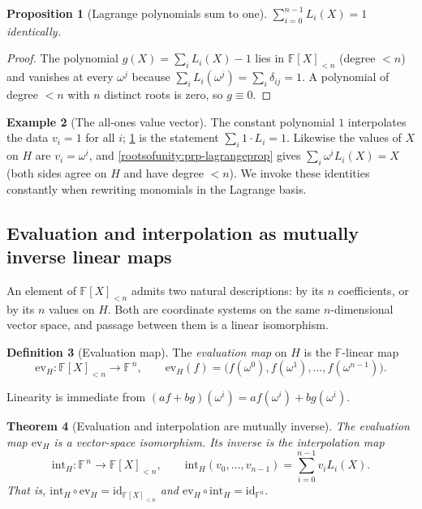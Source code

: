 \documentclass[11pt,a4paper]{article}
\newtheorem{theorem}{Theorem}[section]
\newtheorem{proposition}[theorem]{Proposition}
\theoremstyle{definition}
\newtheorem{definition}[theorem]{Definition}
\newtheorem{example}[theorem]{Example}
\theoremstyle{remark}
\newcommand{\F}{\ensuremath{\mathbb{F}}}
\begin{document}
\begin{proposition}[Lagrange polynomials sum to one]\label{rootsofunity:prp-partition}
\(\sum_{i=0}^{n-1} L_i(X) = 1\) identically.
\end{proposition}

\begin{proof}
The polynomial \(g(X) = \sum_i L_i(X) - 1\) lies in \(\F[X]_{<n}\) (degree \(< n\)) and vanishes at every \(\omega^j\) because \(\sum_i L_i(\omega^j) = \sum_i \delta_{ij} = 1\). A polynomial of degree \(< n\) with \(n\) distinct roots is zero, so \(g \equiv 0\).
\end{proof}

\begin{example}[The all-ones value vector]\label{rootsofunity:exp-constants}
The constant polynomial \(1\) interpolates the data \(v_i = 1\) for all \(i\); \cref{rootsofunity:prp-partition} is the statement \(\sum_i 1\cdot L_i = 1\). Likewise the values of \(X\) on \(H\) are \(v_i = \omega^i\), and \cref{rootsofunity:prp-lagrangeprop} gives \(\sum_i \omega^i L_i(X) = X\) (both sides agree on \(H\) and have degree \(< n\)). We invoke these identities constantly when rewriting monomials in the Lagrange basis.
\end{example}

\subsection{Evaluation and interpolation as mutually inverse linear maps}

An element of \(\F[X]_{<n}\) admits two natural descriptions: by its \(n\) coefficients, or by its \(n\) values on \(H\). Both are coordinate systems on the same \(n\)-dimensional vector space, and passage between them is a linear isomorphism.

\begin{definition}[Evaluation map]\label{rootsofunity:def-evalmap}
The \emph{evaluation map} on \(H\) is the \(\F\)-linear map
\[
  \mathrm{ev}_H \colon \F[X]_{<n} \longrightarrow \F^{\,n}, \qquad
  \mathrm{ev}_H(f) = \bigl(f(\omega^0), f(\omega^1), \dots, f(\omega^{n-1})\bigr).
\]
\end{definition}

Linearity is immediate from \((af+bg)(\omega^i) = a f(\omega^i) + b g(\omega^i)\).

\begin{theorem}[Evaluation and interpolation are mutually inverse]\label{rootsofunity:thm-evaliso}
The evaluation map \(\mathrm{ev}_H\) is a vector-space isomorphism. Its inverse is the \emph{interpolation map}
\[
  \mathrm{int}_H \colon \F^{\,n} \longrightarrow \F[X]_{<n}, \qquad
  \mathrm{int}_H(v_0,\dots,v_{n-1}) = \sum_{i=0}^{n-1} v_i L_i(X).
\]
That is, \(\mathrm{int}_H \circ \mathrm{ev}_H = \mathrm{id}_{\F[X]_{<n}}\) and \(\mathrm{ev}_H \circ \mathrm{int}_H = \mathrm{id}_{\F^n}\).
\end{theorem}
\end{document}
